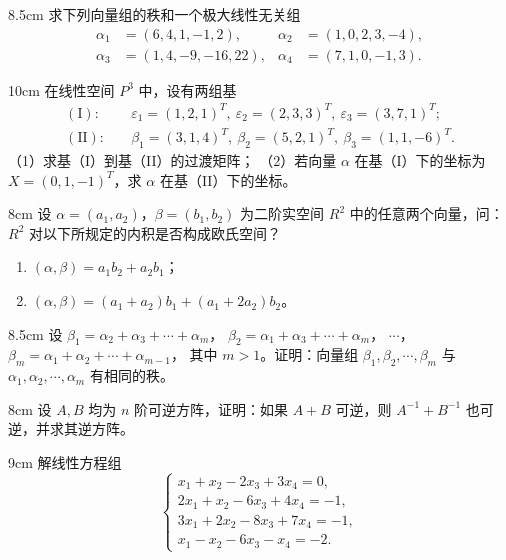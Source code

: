 \begin{problem}{}{8.5cm}
求下列向量组的秩和一个极大线性无关组
\begin{align*}
\alpha_1&=(6,4,1,-1,2), & \alpha_2&=(1,0,2,3,-4),\\
\alpha_3&=(1,4,-9,-16,22), & \alpha_4&=(7,1,0,-1,3).
\end{align*}
\end{problem}

\begin{problem}{}{10cm}
在线性空间 $P^{3}$ 中，设有两组基
\begin{align*}
(\mathrm{I}):\quad & \varepsilon_1=(1,2,1)^{T},\ \varepsilon_2=(2,3,3)^{T},\ \varepsilon_3=(3,7,1)^{T};\\
(\mathrm{II}):\quad & \beta_1=(3,1,4)^{T},\ \beta_2=(5,2,1)^{T},\ \beta_3=(1,1,-6)^{T}.
\end{align*}
（1）求基（I）到基（II）的过渡矩阵；
（2）若向量 $\alpha$ 在基（I）下的坐标为 $X=(0,1,-1)^{T}$，求 $\alpha$ 在基（II）下的坐标。
\end{problem}

\begin{problem}{}{8cm}
设 $\alpha=(a_1,a_2)$，$\beta=(b_1,b_2)$ 为二阶实空间 $R^{2}$ 中的任意两个向量，问：$R^{2}$ 对以下所规定的内积是否构成欧氏空间？
\begin{enumerate}[label=(\arabic*),leftmargin=2.2em,itemsep=0.25em,topsep=0.3em]
  \item $(\alpha,\beta)=a_1b_2+a_2b_1$；
  \item $(\alpha,\beta)=(a_1+a_2)b_1+(a_1+2a_2)b_2$。
\end{enumerate}
\end{problem}

\begin{problem}{}{8.5cm}
设
$\beta_1=\alpha_2+\alpha_3+\cdots+\alpha_m$，
$\beta_2=\alpha_1+\alpha_3+\cdots+\alpha_m$，
$\cdots$，
$\beta_m=\alpha_1+\alpha_2+\cdots+\alpha_{m-1}$，
其中 $m>1$。证明：向量组 $\beta_1,\beta_2,\cdots,\beta_m$ 与 $\alpha_1,\alpha_2,\cdots,\alpha_m$ 有相同的秩。
\end{problem}

\begin{problem}{}{8cm}
设 $A,B$ 均为 $n$ 阶可逆方阵，证明：如果 $A+B$ 可逆，则 $A^{-1}+B^{-1}$ 也可逆，并求其逆方阵。
\end{problem}

\begin{problem}{}{9cm}
解线性方程组
\[
\begin{cases}
x_1+x_2-2x_3+3x_4=0,\\
2x_1+x_2-6x_3+4x_4=-1,\\
3x_1+2x_2-8x_3+7x_4=-1,\\
x_1-x_2-6x_3-x_4=-2.
\end{cases}
\]
\end{problem}

